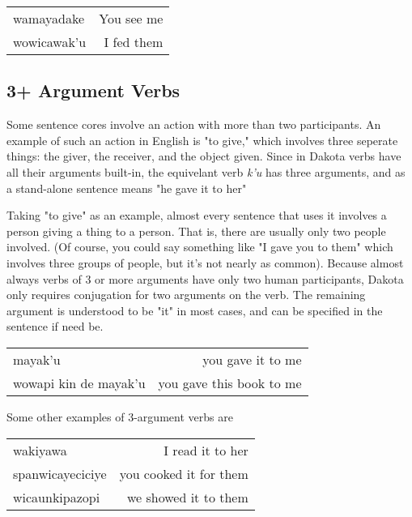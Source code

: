 \documentclass[10pt,letter]{article} %
\begin{document}

\begin{center}
\begin{tabular}{ l r }
  wamayadake & You see me \\
wowicawak'u & I fed them
\end{tabular}
\end{center}

    
	\subsection{3+ Argument Verbs}
Some sentence cores involve an action with more than two participants.  An example of such an action in English is "to give," which involves three seperate things: the giver, the receiver, and the object given.  Since in Dakota verbs have all their arguments built-in, the equivelant verb \emph{k'u} has three arguments, and as a stand-alone sentence means "he gave it to her"

Taking "to give" as an example, almost every sentence that uses it involves a person giving a thing to a person.  That is, there are usually only two people involved.  (Of course, you could say something like "I gave you to them" which involves three groups of people, but it's not nearly as common).  Because almost always verbs of 3 or more arguments have only two human participants, Dakota only requires conjugation for two arguments on the verb.  The remaining argument is understood to be "it" in most cases, and can be specified in the sentence if need be.

\begin{center}
\begin{tabular}{ l r }
 mayak'u &you gave it to me \\
wowapi kin de mayak'u & you gave this book to me
\end{tabular}
\end{center}

Some other examples of 3-argument verbs are

\begin{center}
\begin{tabular}{ l r }
 wakiyawa & I read it to her \\
spanwicayeciciye & you cooked it for them\\
wicaunkipazopi & we showed it to them
\end{tabular}
\end{center}
\end{document}
